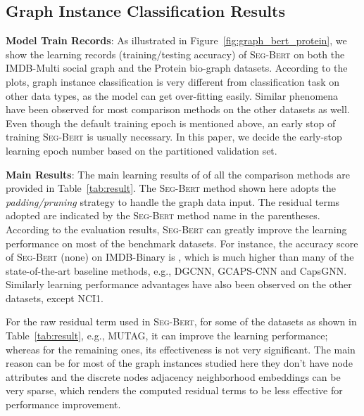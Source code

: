 \documentclass{article}
\newcommand{\our}{\textsc{Seg-Bert}}
\begin{document}
\subsection{Graph Instance Classification Results}\label{subsec:main_result}

\noindent \textbf{Model Train Records}: As illustrated in Figure~\ref{fig:graph_bert_protein}, we show the learning records (training/testing accuracy) of {\our} on both the IMDB-Multi social graph and the Protein bio-graph datasets. According to the plots, graph instance classification is very different from classification task on other data types, as the model can get over-fitting easily. Similar phenomena have been observed for most comparison methods on the other datasets as well. Even though the default training epoch is  mentioned above, an early stop of training {\our} is usually necessary. In this paper, we decide the early-stop learning epoch number based on the partitioned validation set.

\noindent \textbf{Main Results}: The main learning results of of all the comparison methods are provided in Table~\ref{tab:result}. The {\our} method shown here adopts the \textit{padding/pruning} strategy to handle the graph data input. The residual terms adopted are indicated by the {\our} method name in the parentheses. According to the evaluation results, {\our} can greatly improve the learning performance on most of the benchmark datasets. For instance, the accuracy score of {\our} (none) on IMDB-Binary is , which is much higher than many of the state-of-the-art baseline methods, e.g., DGCNN, GCAPS-CNN and CapsGNN. Similarly learning performance advantages have also been observed on the other datasets, except NCI1. 

For the raw residual term used in {\our}, for some of the datasets as shown in Table~\ref{tab:result}, e.g., MUTAG, it can improve the learning performance; whereas for the remaining ones, its effectiveness is not very significant. The main reason can be for most of the graph instances studied here they don't have node attributes and the discrete nodes adjacency neighborhood embeddings can be very sparse, which renders the computed residual terms to be less effective for performance improvement.
\end{document}
